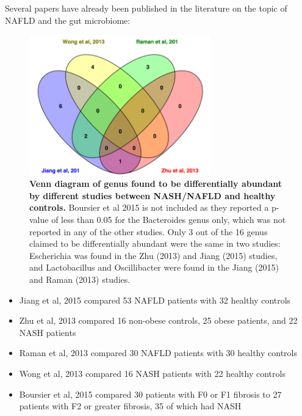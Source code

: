 Several papers have already been published in the literature on the topic of NAFLD and the gut microbiome:

\begin{figure}[h]
\begin{center}
\includegraphics[width=0.7\textwidth]{nafld_papers.png}
\caption{\textbf{Venn diagram of genus found to be differentially abundant by different studies between NASH/NAFLD and healthy controls.} Boursier et al 2015 is not included as they reported a p-value of less than 0.05 for the Bacteroides genus only, which was not reported in any of the other studies. Only 3 out of the 16 genus claimed to be differentially abundant were the same in two studies: Escherichia was found in the Zhu (2013) and Jiang (2015) studies, and Lactobacillus and Oscillibacter were found in the Jiang (2015) and Raman (2013) studies.}
\end{center}
\end{figure}

\begin{itemize}
\item Jiang et al, 2015 compared 53 NAFLD patients with 32 healthy controls

\item Zhu et al, 2013 compared 16 non-obese controls, 25 obese patients, and 22 NASH patients

\item Raman et al, 2013 compared 30 NAFLD patients with 30 healthy controls

\item Wong et al, 2013 compared 16 NASH patients with 22 healthy controls

\item Boursier et al, 2015 compared 30 patients with F0 or F1 fibrosis to 27 patients with F2 or greater fibrosis, 35 of which had NASH
\end{itemize}

